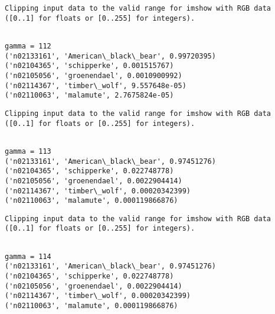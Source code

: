 \documentclass[11pt]{article}
\begin{document}
    \begin{Verbatim}[commandchars=\\\{\}]
Clipping input data to the valid range for imshow with RGB data ([0..1] for floats or [0..255] for integers).

    \end{Verbatim}

    \begin{Verbatim}[commandchars=\\\{\}]

gamma = 112
('n02133161', 'American\_black\_bear', 0.99720395)
('n02104365', 'schipperke', 0.001515767)
('n02105056', 'groenendael', 0.0010900992)
('n02114367', 'timber\_wolf', 9.557648e-05)
('n02110063', 'malamute', 2.7675824e-05)

    \end{Verbatim}

    \begin{Verbatim}[commandchars=\\\{\}]
Clipping input data to the valid range for imshow with RGB data ([0..1] for floats or [0..255] for integers).

    \end{Verbatim}

    \begin{Verbatim}[commandchars=\\\{\}]

gamma = 113
('n02133161', 'American\_black\_bear', 0.97451276)
('n02104365', 'schipperke', 0.022748778)
('n02105056', 'groenendael', 0.0022904414)
('n02114367', 'timber\_wolf', 0.00020342399)
('n02110063', 'malamute', 0.000119866876)

    \end{Verbatim}

    \begin{Verbatim}[commandchars=\\\{\}]
Clipping input data to the valid range for imshow with RGB data ([0..1] for floats or [0..255] for integers).

    \end{Verbatim}

    \begin{Verbatim}[commandchars=\\\{\}]

gamma = 114
('n02133161', 'American\_black\_bear', 0.97451276)
('n02104365', 'schipperke', 0.022748778)
('n02105056', 'groenendael', 0.0022904414)
('n02114367', 'timber\_wolf', 0.00020342399)
('n02110063', 'malamute', 0.000119866876)

    \end{Verbatim}
\end{document}
